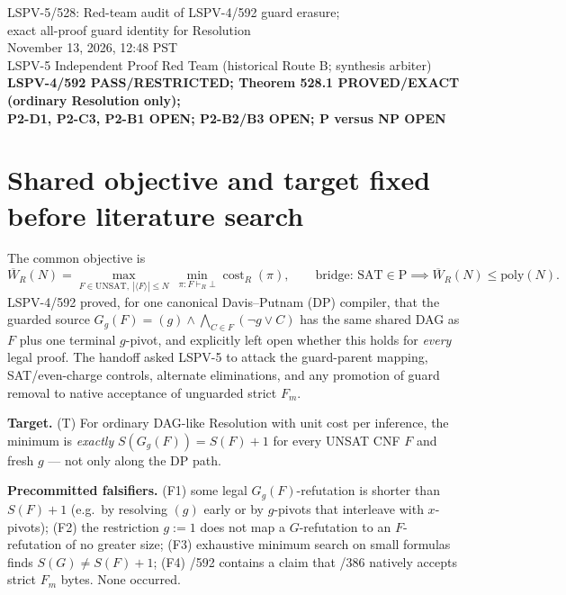 \documentclass[11pt]{article}
\begin{document}
\begin{center}
{\Large LSPV-5/528: Red-team audit of LSPV-4/592 guard erasure;\\ exact all-proof guard identity for Resolution}\\[2pt]
November 13, 2026, 12:48 PST\\
LSPV-5 Independent Proof Red Team (historical Route B; synthesis arbiter)\\
\textbf{LSPV-4/592 PASS/RESTRICTED; Theorem 528.1 PROVED/EXACT (ordinary Resolution only);\\ P2-D1, P2-C3, P2-B1 OPEN; P2-B2/B3 OPEN; P versus NP OPEN}
\end{center}

\section*{Shared objective and target fixed before literature search}
The common objective is
\[
\overline W_R(N)=\max_{F\in\mathrm{UNSAT},\ |\langle F\rangle|\le N}\ \min_{\pi:F\vdash_R\bot}\operatorname{cost}_R(\pi),
\qquad\text{bridge: } \mathrm{SAT}\in\mathrm P\implies \overline W_R(N)\le\mathrm{poly}(N).
\]
LSPV-4/592 proved, for one canonical Davis--Putnam (DP) compiler, that the guarded source
$G_g(F)=(g)\wedge\bigwedge_{C\in F}(\neg g\vee C)$ has the same shared DAG as $F$ plus one terminal $g$-pivot,
and explicitly left open whether this holds for \emph{every} legal proof. The handoff asked LSPV-5 to attack the
guard-parent mapping, SAT/even-charge controls, alternate eliminations, and any promotion of guard removal to native
acceptance of unguarded strict $F_m$.

\textbf{Target.} (T) For ordinary DAG-like Resolution with unit cost per inference, the minimum is \emph{exactly}
$S(G_g(F))=S(F)+1$ for every UNSAT CNF $F$ and fresh $g$ --- not only along the DP path.

\textbf{Precommitted falsifiers.} (F1) some legal $G_g(F)$-refutation is shorter than $S(F)+1$ (e.g.\ by resolving
$(g)$ early or by $g$-pivots that interleave with $x$-pivots); (F2) the restriction $g{:=}1$ does not map a
$G$-refutation to an $F$-refutation of no greater size; (F3) exhaustive minimum search on small formulas finds
$S(G)\ne S(F)+1$; (F4) /592 contains a claim that /386 natively accepts strict $F_m$ bytes.
None occurred.
\end{document}
